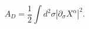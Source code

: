 \begin{equation}
\label{area2}
A_D=\frac{1}{2}\int d^2\sigma |\partial_{\sigma}X^{\alpha}|^2.
\end{equation} 
